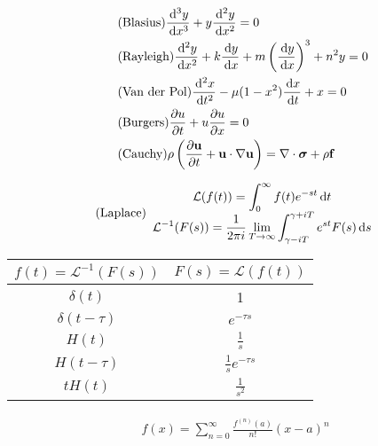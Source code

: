 \documentclass[landscape,paperwidth=1920pt, paperheight = 1080pt,fontscale=0.45,columns=3, margin = 0px]{Poster} %
\begin{document}
\begin{poster}
{\begin{align*}
  & \tag{Blasius}
  \frac{\,\mathrm{d}^3y}{\,\mathrm{d} x^3} + y\frac{\,\mathrm{d}^2y}{\,\mathrm{d} x^2}=0\\
  & \tag{Rayleigh}
  \frac{\,\mathrm{d}^2y}{\,\mathrm{d} x^2}+k\frac{\,\mathrm{d} y}{\,\mathrm{d} x}+m\left(\frac{\,\mathrm{d} y}{\,\mathrm{d} x}\right)^3+n^2y= 0\\
  & \tag{Van der Pol}
  \frac{\,\mathrm{d} ^2x}{\,\mathrm{d} t^2} -\mu(1-x^2)\frac{\,\mathrm{d} x}{\,\mathrm{d} t} + x=0\\
  & \tag{Burgers}
  \frac{\partial u}{\partial t}+u\frac{\partial u}{\partial x}=0\\
  & \tag{Cauchy}
  \rho\left(\frac{\partial \mathbf{u}}{\partial t} +\mathbf{u}\cdot \nabla\mathbf{u}\right) = \nabla \cdot \bm\sigma + \rho\mathbf{f}
\end{align*}

\begin{align*}
  & \tag{Laplace}
  \begin{array}{c}
    \displaystyle\mathcal{L}(f(t)) = \int_0^\infty f(t) e^{-st}\,\mathrm{d} t\\
    \displaystyle\mathcal{L}^{-1}(F(s)) = \dfrac{1}{2\pi i}\lim_{T\rightarrow\infty}\int_{\gamma-iT}^{\gamma+iT} e^{st}F(s)\,\mathrm{d} s
  \end{array}
\end{align*}

\begin{center}
\begin{tabular}{|c|c|}
  \hline
  $f(t) = \mathcal{L}^{-1}(F(s))$ & $F(s) = \mathcal{L}(f(t))$ \\ \hline
  $\delta(t)$ & 1 \\ \hline
  $\delta(t-\tau)$ & $e^{-\tau s}$ \\ \hline
  $H(t)$ & $\frac{1}{s}$ \\ \hline
  $H(t-\tau)$ & $\frac{1}{s}e^{-\tau s}$ \\ \hline
  $tH(t)$ & $\frac{1}{s^2}$ \\ \hline
\end{tabular}
\end{center}

\begin{align*}
  &\tag{Taylor}
  f(x) = \sum_{n=0}^\infty \frac{f^(n)(a)}{n!}(x-a)^n
\end{align*}
}


\end{poster}
\end{document}

